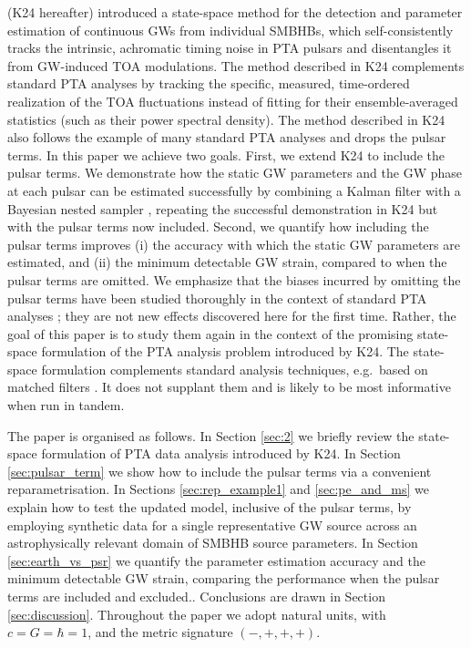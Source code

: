 \documentclass[fleqn,usenatbib,useAMS]{mnras}
\begin{document}
\cite{KimpsonPTA} (K24 hereafter) introduced a state-space method for the detection and parameter estimation of continuous GWs from individual SMBHBs, which self-consistently tracks the intrinsic, achromatic timing noise in PTA pulsars \citep[e.g.][]{Shannon2010,Lasky2015,Caballero2016,Goncharov2021} and disentangles it from GW-induced TOA modulations. The method described in K24 complements standard PTA analyses by tracking the specific, measured, time-ordered realization of the TOA fluctuations instead of fitting for their ensemble-averaged statistics (such as their power spectral density). The method described in K24 also follows the example of many standard PTA analyses and drops the pulsar terms. In this paper we achieve two goals. First, we extend K24 to include the pulsar terms. We demonstrate how the static GW parameters and the GW phase at each pulsar can be estimated successfully by combining a Kalman filter \citep{Kalman1} with a Bayesian nested sampler \citep{Skilling, Ashton2022}, repeating the successful demonstration in K24 but with the pulsar terms now included. Second, we quantify how including the pulsar terms improves (i) the accuracy with which the static GW parameters are estimated, and (ii) the minimum detectable GW strain, compared to when the pulsar terms are omitted. We emphasize that the biases incurred by omitting the pulsar terms have been studied thoroughly in the context of standard PTA analyses \citep{Zhupulsarterms,Chen2022}; they are not new effects discovered here for the first time. Rather, the goal of this paper is to study them again in the context of the promising state-space formulation of the PTA analysis problem introduced by K24. The state-space formulation complements standard analysis techniques, e.g.\ based on matched filters \citep{PhysRevD.79.084030,PhysRevD.91.044048}. It does not supplant them and is likely to be most informative when run in tandem. \newline 



The paper is organised as follows. In Section \ref{sec:2} we briefly review the state-space formulation of PTA data analysis introduced by K24. In Section \ref{sec:pulsar_term} we show how to include the pulsar terms via a convenient reparametrisation. In Sections \ref{sec:rep_example1} and \ref{sec:pe_and_ms} we explain how to test the updated model, inclusive of the pulsar terms, by employing synthetic data for a single representative GW source across an astrophysically relevant domain of SMBHB source parameters. In Section \ref{sec:earth_vs_psr} we quantify the parameter estimation accuracy and the minimum detectable GW strain, comparing the performance when the pulsar terms are included and excluded.. Conclusions are drawn in Section \ref{sec:discussion}. Throughout the paper we adopt natural units, with $c = G = \hbar = 1$, and the metric signature $(-,+,+,+)$. \newline 
\end{document}
